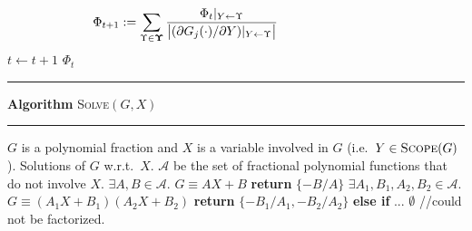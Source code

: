 \documentclass[]{article}
\begin{document}
\begin{algorithm}
\begin{algorithmic}
\begin{equation}
\label{e:core}
\hspace{-28mm}
\Phi_{t + 1} 
:=
\sum_{\Upsilon \in \boldsymbol{\Upsilon}}
\frac{{\Phi_t}|_{Y \leftarrow \Upsilon}}{
\big|(\partial G_j(\cdot) / \partial Y) |_{Y \leftarrow \Upsilon}
\big|
}
\end{equation} \vspace{-4mm}
	\STATE $t \leftarrow t + 1 $	
\ENDFOR
 $\Phi_t$
\vspace{2mm}\hrule\vspace{0.5mm}
\STATE \hspace{-3mm} {\bf Algorithm }\textsc{Solve}$(G, X)$ 
\vspace{0.5mm}\hrule\vspace{0.7mm}
 $G$ is a polynomial fraction and $X$ is a variable involved in $G$ (i.e.\ $Y \in \textsc{Scope}(G)$).
 Solutions of $G$ w.r.t.\ $X$.
 $\mathcal{A}$ be the set of fractional polynomial functions that do not involve $X$. 
{\small
{} $\exists A, B \in \mathcal{A}$. \;$G \equiv A X + B$ {\bf return} $\{-B/A\}$
 $\exists A_1, B_1, A_2, B_2 \in \mathcal{A}$. \;$G \equiv (A_1 X + B_1)(A_2 X + B_2)  $ 
\STATE \hspace{3mm} {\bf return} $\{-B_1/A_1, -B_2/A_2\}$ {\bf else if} ...
 $\emptyset$ \hspace*{\fill} //could not be factorized. }
\end{algorithmic}
\end{algorithm}
\end{document}
